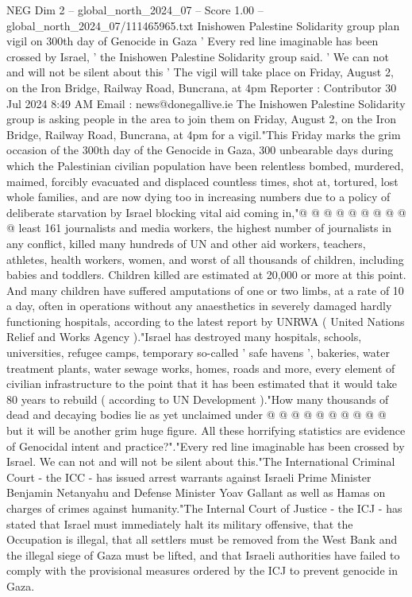 \begin{textsample}{NEG Dim 2 – global\_north\_2024\_07 – Score 1.00 – global\_north\_2024\_07/111465965.txt}  \label{ex:f2_neg_255}
Inishowen Palestine Solidarity group plan vigil on 300th day of Genocide in Gaza ' Every red line imaginable has been crossed by Israel, ' the Inishowen Palestine Solidarity group said. ' We can not and will not be silent about this ' The vigil will take place on Friday, August 2, on the Iron Bridge, Railway Road, Buncrana, at 4pm Reporter : Contributor 30 Jul 2024 8:49 AM Email : news@donegallive.ie The Inishowen Palestine Solidarity group is asking people in the area to join them on Friday, August 2, on the Iron Bridge, Railway Road, Buncrana, at 4pm for a vigil."This Friday marks the grim occasion of the 300th day of the Genocide in Gaza, 300 unbearable days during which the Palestinian civilian population have been relentless bombed, murdered, maimed, forcibly evacuated and displaced countless times, shot at, tortured, lost whole families, and are now dying too in increasing numbers due to a policy of deliberate starvation by Israel blocking vital aid coming in,"@ @ @ @ @ @ @ @ @ @ least 161 journalists and media workers, the highest number of journalists in any conflict, killed many hundreds of UN and other aid workers, teachers, athletes, health workers, women, and worst of all thousands of children, including babies and toddlers.
Children killed are estimated at 20,000 or more at this point.
And many children have suffered amputations of one or two limbs, at a rate of 10 a day, often in operations without any anaesthetics in severely damaged hardly functioning hospitals, according to the latest report by UNRWA ( United Nations Relief and Works Agency )."Israel has destroyed many hospitals, schools, universities, refugee camps, temporary so-called ' safe havens ', bakeries, water treatment plants, water sewage works, homes, roads and more, every element of civilian infrastructure to the point that it has been estimated that it would take 80 years to rebuild ( according to UN Development )."How many thousands of dead and decaying bodies lie as yet unclaimed under @ @ @ @ @ @ @ @ @ @ but it will be another grim huge figure.
All these horrifying statistics are evidence of Genocidal intent and practice?"."Every red line imaginable has been crossed by Israel.
We can not and will not be silent about this."The International Criminal Court - the ICC - has issued arrest warrants against Israeli Prime Minister Benjamin Netanyahu and Defense Minister Yoav Gallant as well as Hamas on charges of crimes against humanity."The Internal Court of Justice - the ICJ - has stated that Israel must immediately halt its military offensive, that the Occupation is illegal, that all settlers must be removed from the West Bank and the illegal siege of Gaza must be lifted, and that Israeli authorities have failed to comply with the provisional measures ordered by the ICJ to prevent genocide in Gaza.

\end{textsample}
